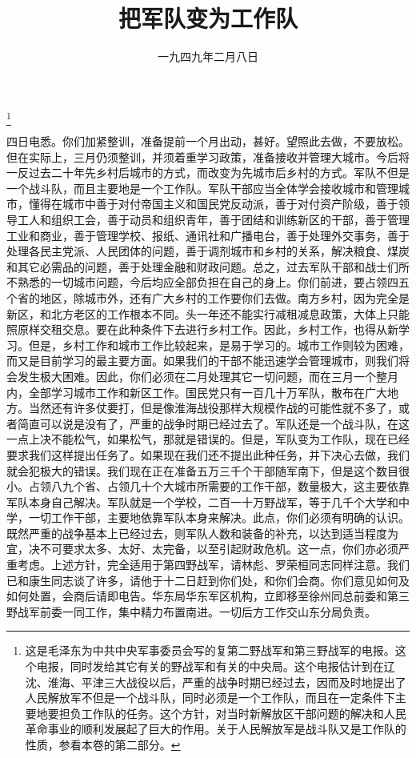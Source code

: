 
\title{把军队变为工作队}
\date{一九四九年二月八日}
\thanks{这是毛泽东为中共中央军事委员会写的复第二野战军和第三野战军的电报。这个电报，同时发给其它有关的野战军和有关的中央局。这个电报估计到在辽沈、淮海、平津三大战役以后，严重的战争时期已经过去，因而及时地提出了人民解放军不但是一个战斗队，同时必须是一个工作队，而且在一定条件下主要地要担负工作队的任务。这个方针，对当时新解放区干部问题的解决和人民革命事业的顺利发展起了巨大的作用。关于人民解放军是战斗队又是工作队的性质，参看本卷的第二部分。}
\maketitle


四日电悉。你们加紧整训，准备提前一个月出动，甚好。望照此去做，不要放松。但在实际上，三月仍须整训，并须着重学习政策，准备接收并管理大城市。今后将一反过去二十年先乡村后城市的方式，而改变为先城市后乡村的方式。军队不但是一个战斗队，而且主要地是一个工作队。军队干部应当全体学会接收城市和管理城市，懂得在城市中善于对付帝国主义和国民党反动派，善于对付资产阶级，善于领导工人和组织工会，善于动员和组织青年，善于团结和训练新区的干部，善于管理工业和商业，善于管理学校、报纸、通讯社和广播电台，善于处理外交事务，善于处理各民主党派、人民团体的问题，善于调剂城市和乡村的关系，解决粮食、煤炭和其它必需品的问题，善于处理金融和财政问题。总之，过去军队干部和战士们所不熟悉的一切城市问题，今后均应全部负担在自己的身上。你们前进，要占领四五个省的地区，除城市外，还有广大乡村的工作要你们去做。南方乡村，因为完全是新区，和北方老区的工作根本不同。头一年还不能实行减租减息政策，大体上只能照原样交租交息。要在此种条件下去进行乡村工作。因此，乡村工作，也得从新学习。但是，乡村工作和城市工作比较起来，是易于学习的。城市工作则较为困难，而又是目前学习的最主要方面。如果我们的干部不能迅速学会管理城市，则我们将会发生极大困难。因此，你们必须在二月处理其它一切问题，而在三月一个整月内，全部学习城市工作和新区工作。国民党只有一百几十万军队，散布在广大地方。当然还有许多仗要打，但是像淮海战役那样大规模作战的可能性就不多了，或者简直可以说是没有了，严重的战争时期已经过去了。军队还是一个战斗队，在这一点上决不能松气，如果松气，那就是错误的。但是，军队变为工作队，现在已经要求我们这样提出任务了。如果现在我们还不提出此种任务，并下决心去做，我们就会犯极大的错误。我们现在正在准备五万三千个干部随军南下，但是这个数目很小。占领八九个省、占领几十个大城市所需要的工作干部，数量极大，这主要依靠军队本身自己解决。军队就是一个学校，二百一十万野战军，等于几千个大学和中学，一切工作干部，主要地依靠军队本身来解决。此点，你们必须有明确的认识。既然严重的战争基本上已经过去，则军队人数和装备的补充，以达到适当程度为宜，决不可要求太多、太好、太完备，以至引起财政危机。这一点，你们亦必须严重考虑。上述方针，完全适用于第四野战军，请林彪、罗荣桓同志同样注意。我们已和康生同志谈了许多，请他于十二日赶到你们处，和你们会商。你们意见如何及如何处置，会商后请即电告。华东局华东军区机构，立即移至徐州同总前委和第三野战军前委一同工作，集中精力布置南进。一切后方工作交山东分局负责。


